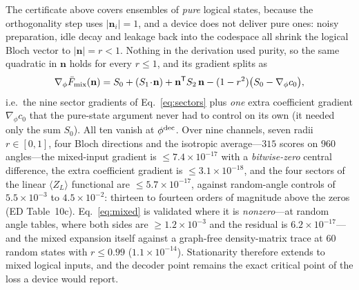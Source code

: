 \documentclass[aps,prxquantum,reprint,superscriptaddress]{revtex4-2}
\begin{document}
The certificate above covers ensembles of \emph{pure} logical states, because the
orthogonality step uses $|\mathbf n_i|=1$, and a device does not deliver pure
ones: noisy preparation, idle decay and leakage back into the codespace all shrink
the logical Bloch vector to $|\mathbf n|=r<1$. Nothing in the derivation used
purity, so the same quadratic in $\mathbf n$ holds for every $r\le1$, and its
gradient splits as
\begin{equation}
\nabla_\phi\bar F_{\rm mix}(\mathbf n)=S_0+(S_1\!\cdot\!\mathbf n)+
\mathbf n^{\mathsf T}S_2\,\mathbf n-(1-r^2)\big(S_0-\nabla_\phi c_0\big),
\label{eq:mixed}
\end{equation}
i.e.\ the nine sector gradients of Eq.~\eqref{eq:sectors} plus \emph{one} extra
coefficient gradient $\nabla_\phi c_0$ that the pure-state argument never had to
control on its own (it needed only the sum $S_0$). All ten vanish at
$\phi^{\rm dec}$. Over nine channels, seven radii $r\in[0,1]$, four Bloch
directions and the isotropic average---$315$ scores on $960$ angles---the
mixed-input gradient is $\le7.4\times10^{-17}$ with a \emph{bitwise-zero} central
difference, the extra coefficient gradient is $\le3.1\times10^{-18}$, and the four
sectors of the linear $\langle Z_L\rangle$ functional are $\le5.7\times10^{-17}$,
against random-angle controls of $5.5\times10^{-3}$ to $4.5\times10^{-2}$: thirteen
to fourteen orders of magnitude above the zeros (ED Table~10c).
Eq.~\eqref{eq:mixed} is validated where it is \emph{nonzero}---at random angle
tables, where both sides are $\ge1.2\times10^{-3}$ and the residual is
$6.2\times10^{-17}$---and the mixed expansion itself against a graph-free
density-matrix trace at $60$ random states with $r\le0.99$ ($1.1\times10^{-14}$).
Stationarity therefore extends to mixed logical inputs, and the decoder point
remains the exact critical point of the loss a device would report.
\end{document}
